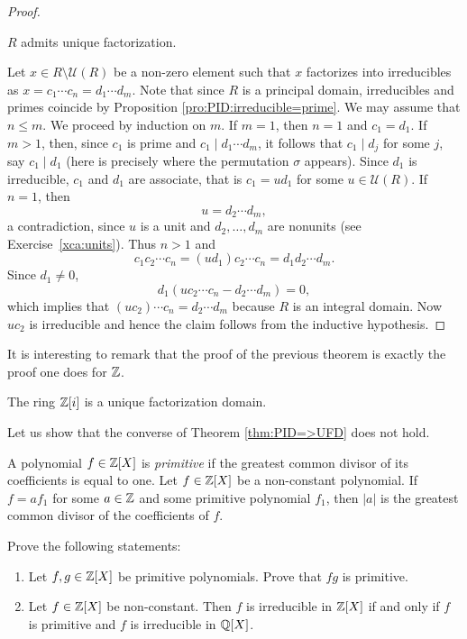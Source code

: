 \begin{proof}
	\begin{claim}
		$R$ admits unique factorization.	
	\end{claim}
	
  Let $x\in R\setminus\mathcal{U}(R)$ be a non-zero element such that $x$
  factorizes into irreducibles as $x=c_1\cdots c_n=d_1\cdots d_m$. 
	Note that since $R$ is a principal domain, irreducibles and primes coincide by 
	Proposition \ref{pro:PID:irreducible=prime}. 
	We may assume that $n\leq m$. We proceed by 
	induction on $m$. If $m=1$, then 
	$n=1$ and $c_1=d_1$. If $m>1$, then, since $c_1$ is prime and 
	$c_1\mid d_1\cdots d_m$, it follows that $c_1\mid d_j$ for some $j$, 
	say $c_1\mid d_1$ (here is precisely where the permutation $\sigma$ appears). Since
	$d_1$ is irreducible, $c_1$ and $d_1$ are associate, that is
	$c_1=ud_1$ for some $u\in\mathcal{U}(R)$. 
  If $n=1$, then 
  \[
  u=d_2\cdots d_m, 
  \]
  a contradiction, since $u$ is a unit and $d_2,\dots,d_m$ are nonunits (see
  Exercise~\ref{xca:units}). Thus $n>1$ and 
	\[
	c_1c_2\cdots c_n=(ud_1)c_2\cdots c_n=d_1d_2\cdots d_m. 
	\]
	Since $d_1\ne 0$,  
	\[
	d_1(uc_2\cdots c_n-d_2\cdots d_m)=0,
	\]
  which implies that $(uc_2)\cdots c_n=d_2\cdots d_m$ because $R$ is an
  integral domain. Now
  $uc_2$ is irreducible and hence the claim follows from the inductive
  hypothesis. 
\end{proof}

It is interesting to remark that the proof 
of the previous theorem is exactly the proof
one does for $\mathbb{Z}$. 

\begin{example}
	The ring $\mathbb{Z}[i]$ is a unique factorization domain. 	
\end{example}

Let us show that the converse of Theorem \ref{thm:PID=>UFD} does not hold. 

\begin{exercise}
\label{xca:content}
	A polynomial $f\in\mathbb{Z}[X]$ is \emph{primitive} if
	the greatest common divisor of its coefficients is equal to one. 
	Let $f\in\mathbb{Z}[X]$ be a non-constant polynomial. If $f=af_1$ for some $a\in\mathbb{Z}$ and some
	primitive polynomial $f_1$, then $|a|$ is the greatest common divisor of the coefficients of $f$. 	
\end{exercise}

\begin{exercise}
\label{xca:Gauss}
Prove the following statements:
\begin{enumerate}
    \item Let $f,g\in\mathbb{Z}[X]$ be primitive polynomials. Prove that $fg$ is primitive.
    \item Let $f\in\mathbb{Z}[X]$ be non-constant. Then
$f$ is irreducible in $\mathbb{Z}[X]$ if and only if $f$ is primitive and 
$f$ is irreducible in $\mathbb{Q}[X]$. 
\end{enumerate}
\end{exercise}

